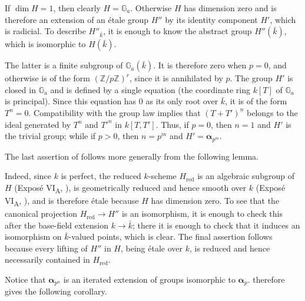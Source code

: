 
If \(\dim H=1\), then clearly \(H=\mathbb G_a\).  Otherwise \(H\) has
dimension zero and is therefore an extension of an étale group \(H''\) by its
identity component \(H'\), which is radicial.  To describe \(H''_{\bar{k}}\),
it is enough to know the abstract group \(H''(\bar{k})\), which is isomorphic
to \(H(\bar{k})\).

The latter is a finite subgroup of \(\mathbb G_a(\bar{k})\).  It is therefore
zero when \(p=0\), and otherwise is of the form
\((\mathbb Z/p\mathbb Z)^r\), since it is annihilated by \(p\).  The group
\(H'\) is closed in \(\mathbb G_a\) and is defined by a single equation
(the coordinate ring \(k[T]\) of \(\mathbb G_a\) is principal).
Since this equation has \(0\) as its only root over \(\bar{k}\), it is of the
form \(T^n=0\).  Compatibility with the group law implies that
\((T+T')^n\) belongs to the ideal generated by \(T^n\) and \(T'^n\) in
\(k[T,T']\).  Thus, if \(p=0\), then \(n=1\) and \(H'\) is the trivial
group; while if \(p>0\), then \(n=p^m\) and
\(H'=\boldsymbol\alpha_{p^m}\).

The last assertion of  follows more generally from the
following lemma.


Indeed, since \(k\) is perfect, the reduced \(k\)-scheme
\(H_{\mathrm{red}}\) is an algebraic subgroup of \(H\)
(Exposé VI\textsubscript{A}, ), is geometrically reduced and hence smooth
over \(k\) (Exposé VI\textsubscript{A}, ), and is therefore étale because
\(H\) has dimension zero.  To see that the canonical projection
\(H_{\mathrm{red}}\to H''\) is an isomorphism, it is enough to check this after
the base-field extension \(k\to\bar{k}\); there it is enough to check that it
induces an isomorphism on \(\bar{k}\)-valued points, which is clear.  The final
assertion follows because every lifting of \(H''\) in \(H\), being étale over
\(k\), is reduced and hence necessarily contained in \(H_{\mathrm{red}}\).

Notice that \(\boldsymbol\alpha_{p^n}\) is an iterated extension of groups
isomorphic to \(\boldsymbol\alpha_p\).   therefore gives the
following corollary.

